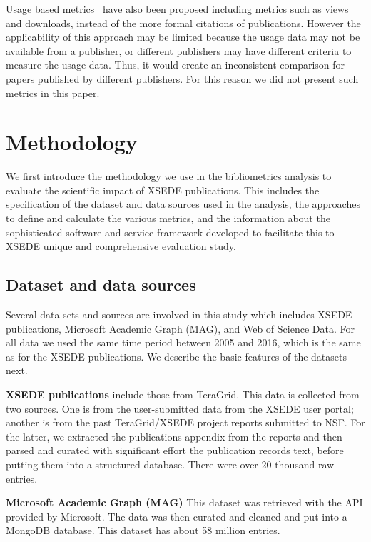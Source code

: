 \documentclass{sig-alternate}
\begin{document}
Usage based
metrics~\cite{Bollen:2007:MUM:1255175.1255273,Bollen:2008:TUI:1378889.1378928}
have also been proposed including metrics such as views and downloads,
instead of the more formal citations of publications. However the
applicability of this approach may be limited because the usage data
may not be available from a publisher, or different publishers may
have different criteria to measure the usage data. Thus, it would
create an inconsistent comparison for papers published by different
publishers.  For this reason we did not present such metrics in this
paper.

\section{Methodology} \label{S:methodology}

We first introduce the methodology we use in the bibliometrics
analysis to evaluate the scientific impact of XSEDE publications. This
includes the specification of the dataset and data sources used in the
analysis, the approaches to define and calculate the various metrics,
and the information about the sophisticated software and service
framework developed to facilitate this to XSEDE unique and
comprehensive evaluation study.

\subsection{Dataset and data sources}

Several data sets and sources are involved in this study which
includes XSEDE publications, Microsoft Academic Graph (MAG), and Web
of Science Data. For all data we used the same time period between
2005 and 2016, which is the same as for the XSEDE publications. We
describe the basic features of the datasets next.

\parindent 0pt \textbf{XSEDE publications} include those from
TeraGrid. This data is collected from two sources. One is from the
user-submitted data from the XSEDE user portal; another is from the
past TeraGrid/XSEDE project reports submitted to NSF. For the latter,
we extracted the publications appendix from the reports and then
parsed and curated with significant effort the publication records
text, before putting them into a structured database. There were over
20 thousand raw entries.

\parindent 0pt \textbf{Microsoft Academic Graph (MAG)} This dataset
was retrieved with the API provided by Microsoft. The data was then
curated and cleaned and put into a MongoDB database. This dataset has
about 58 million entries.
\end{document}
